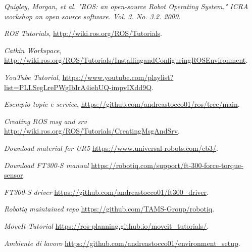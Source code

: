 \begin{thebibliography}{99}

 \textit{Quigley, Morgan, et al. "ROS: an open-source Robot Operating System." ICRA workshop on open source software. 
Vol. 3. No. 3.2. 2009.}

 \textit{ROS Tutorials}, \url{http://wiki.ros.org/ROS/Tutorials}.

 \textit{Catkin Workspace}, \url{http://wiki.ros.org/ROS/Tutorials/InstallingandConfiguringROSEnvironment}.

 \textit{YouTube Tutorial}, \url{https://www.youtube.com/playlist?list=PLLSegLrePWgIbIrA4iehUQ-impvIXdd9Q}.

 \textit{Esempio topic e service}, \url{https://github.com/andreastocco01/ros/tree/main}.

 \textit{Creating ROS msg and srv} \url{http://wiki.ros.org/ROS/Tutorials/CreatingMsgAndSrv}.

 \textit{Download material for UR5} \url{https://www.universal-robots.com/cb3/}.

 \textit{Download FT300-S manual} \url{https://robotiq.com/support/ft-300-force-torque-sensor}.

 \textit{FT300-S driver} \url{https://github.com/andreastocco01/ft300_driver}.

 \textit{Robotiq maintained repo} \url{https://github.com/TAMS-Group/robotiq}.

 \textit{MoveIt Tutorial} \url{https://ros-planning.github.io/moveit_tutorials/}.

 \textit{Ambiente di lavoro} \url{https://github.com/andreastocco01/environment_setup}.
\end{thebibliography}